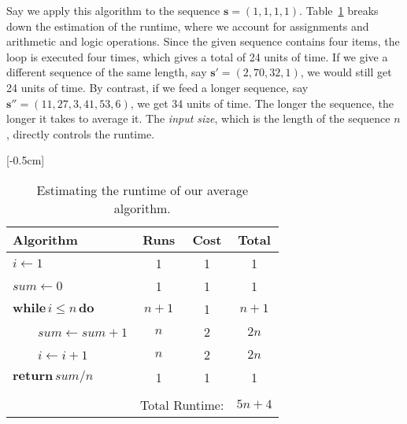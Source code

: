 \documentclass{aldast}
\begin{document}
Say we apply this algorithm to the sequence
$\mathbf{s}=(1,1,1,1)$. Table~\ref{tab:average} breaks down the
estimation of the runtime, where we account for assignments and
arithmetic and logic operations. Since the given sequence contains
four items, the loop is executed four times, which gives a total of 24
units of time. If we give a different sequence of the same length, say
$\mathbf{s}'=(2,70,32,1)$, we would still get 24 units of time. By
contrast, if we feed a longer sequence, say
$\mathbf{s}''=(11,27,3,41,53,6)$, we get 34 units of time. The longer
the sequence, the longer it takes to average it. The \emph{input
 size}, which is the length of the sequence $n$, directly controls
the runtime.

\begin{table}[htbp]
  [-0.5cm]
  \begin{center}
    \begin{tabular}{lccc}
      \toprule
      Algorithm                                   & Runs                               & Cost & Total \\
      \midrule
      $i \gets 1$                                 & 1                                  & 1    & 1     \\
      $sum \gets 0$                               & 1                                  & 1    & 1     \\
      $\mathbf{while} \, i \leq n \, \mathbf{do}$ & $n+1$                              & 1    & $n+1$ \\
      ~~~~$sum \gets sum + 1$                     & $n$                                & 2    & $2n$  \\
      ~~~~$i \gets i + 1$                         & $n$                                & 2    & $2n$  \\
      $\mathbf{return}\, sum / n$                 & 1                                  & 1    & 1     \\
      \hline                                                                                          \\[-3mm]
                                                  & \multicolumn{2}{r}{Total Runtime:} & $5n+4$       \\
      \bottomrule
    \end{tabular}
  \end{center}
  \caption{Estimating the runtime of our average algorithm.}
  \label{tab:average}
\end{table}
\end{document}

